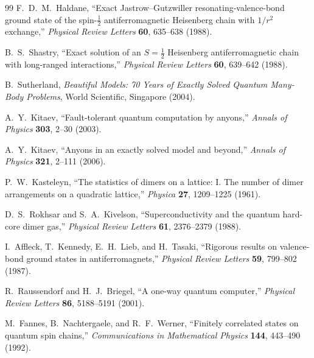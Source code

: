 \documentclass[12pt,openany]{book}
\theoremstyle{definition}
\theoremstyle{plain}
\begin{document}
\begin{thebibliography}{99}
F.~D.~M.~Haldane,
``Exact Jastrow--Gutzwiller resonating-valence-bond ground state of the
spin-$\frac12$ antiferromagnetic Heisenberg chain with $1/r^2$ exchange,''
\emph{Physical Review Letters} \textbf{60}, 635--638 (1988).

B.~S.~Shastry,
``Exact solution of an $S=\frac12$ Heisenberg antiferromagnetic chain with
long-ranged interactions,''
\emph{Physical Review Letters} \textbf{60}, 639--642 (1988).

B.~Sutherland,
\emph{Beautiful Models: 70 Years of Exactly Solved Quantum Many-Body Problems},
World Scientific, Singapore (2004).


A.~Y.~Kitaev,
``Fault-tolerant quantum computation by anyons,''
\emph{Annals of Physics} \textbf{303}, 2--30 (2003).

A.~Y.~Kitaev,
``Anyons in an exactly solved model and beyond,''
\emph{Annals of Physics} \textbf{321}, 2--111 (2006).


P.~W.~Kasteleyn,
``The statistics of dimers on a lattice: I. The number of dimer arrangements on
a quadratic lattice,''
\emph{Physica} \textbf{27}, 1209--1225 (1961).

D.~S.~Rokhsar and S.~A.~Kivelson,
``Superconductivity and the quantum hard-core dimer gas,''
\emph{Physical Review Letters} \textbf{61}, 2376--2379 (1988).

I.~Affleck, T.~Kennedy, E.~H.~Lieb, and H.~Tasaki,
``Rigorous results on valence-bond ground states in antiferromagnets,''
\emph{Physical Review Letters} \textbf{59}, 799--802 (1987).

R.~Raussendorf and H.~J.~Briegel,
``A one-way quantum computer,''
\emph{Physical Review Letters} \textbf{86}, 5188--5191 (2001).

M.~Fannes, B.~Nachtergaele, and R.~F.~Werner,
``Finitely correlated states on quantum spin chains,''
\emph{Communications in Mathematical Physics} \textbf{144}, 443--490 (1992).


\end{thebibliography}
\end{document}
